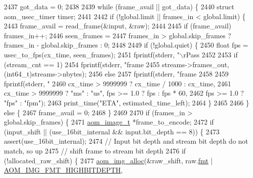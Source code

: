 \begin{DoxyCodeInclude}
{{{{{{{{{{{{{{{{{{{{{{{{{{{{{{{{{{{{{{{{{{{{{{{{{{{{{{{2437     got\_data = 0;
2438 
2439     \textcolor{keywordflow}{while} (frame\_avail || got\_data) \{
2440       \textcolor{keyword}{struct }aom\_usec\_timer timer;
2441 
2442       \textcolor{keywordflow}{if} (!global.limit || frames\_in < global.limit) \{
2443         frame\_avail = read\_frame(&input, &raw);
2444 
2445         \textcolor{keywordflow}{if} (frame\_avail) frames\_in++;
2446         seen\_frames =
2447             frames\_in > global.skip\_frames ? frames\_in - global.skip\_frames : 0;
2448 
2449         \textcolor{keywordflow}{if} (!global.quiet) \{
2450           \textcolor{keywordtype}{float} fps = usec\_to\_fps(cx\_time, seen\_frames);
2451           fprintf(stderr, \textcolor{stringliteral}{"\(\backslash\)rPass %
2452 
2453           \textcolor{keywordflow}{if} (stream\_cnt == 1)
2454             fprintf(stderr, \textcolor{stringliteral}{"frame %
2455                     streams->frames\_out, (int64\_t)streams->nbytes);
2456           \textcolor{keywordflow}{else}
2457             fprintf(stderr, \textcolor{stringliteral}{"frame %
2458 
2459           fprintf(stderr, \textcolor{stringliteral}{"%
2460                   cx\_time > 9999999 ? cx\_time / 1000 : cx\_time,
2461                   cx\_time > 9999999 ? \textcolor{stringliteral}{"ms"} : \textcolor{stringliteral}{"us"}, fps >= 1.0 ? fps : fps * 60,
2462                   fps >= 1.0 ? \textcolor{stringliteral}{"fps"} : \textcolor{stringliteral}{"fpm"});
2463           print\_time(\textcolor{stringliteral}{"ETA"}, estimated\_time\_left);
2464         \}
2465 
2466       \} \textcolor{keywordflow}{else} \{
2467         frame\_avail = 0;
2468       \}
2469 
2470       \textcolor{keywordflow}{if} (frames\_in > global.skip\_frames) \{
2471         \hyperlink{structaom__image}{aom\_image\_t} *frame\_to\_encode;
2472         \textcolor{keywordflow}{if} (input\_shift || (use\_16bit\_internal && input.bit\_depth == 8)) \{
2473           assert(use\_16bit\_internal);
2474           \textcolor{comment}{// Input bit depth and stream bit depth do not match, so up}
2475           \textcolor{comment}{// shift frame to stream bit depth}
2476           \textcolor{keywordflow}{if} (!allocated\_raw\_shift) \{
2477             \hyperlink{aom__image_8h_a570db29fbd122951235a08fe9375f6bb}{aom\_img\_alloc}(&raw\_shift, raw.\hyperlink{structaom__image_a6c64b1ab918d80d52eb8f5d6d957e825}{fmt} | 
      \hyperlink{aom__image_8h_a607b37d91f75442f54223ecd85f1b6cb}{AOM\_IMG\_FMT\_HIGHBITDEPTH},
}}}}}}}}}}}}}}}}}}}}}}}}}}}}}}}}}}}}}}}}}}}}}}}}}}}}}}}}}}}
\end{DoxyCodeInclude}
